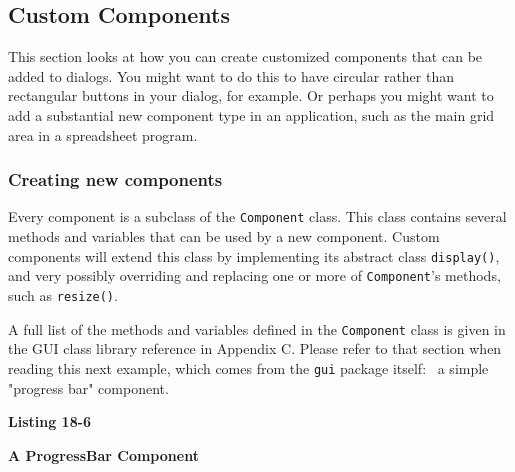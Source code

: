 \subsection{Custom Components}

This section looks at how you can create customized components that can
be added to dialogs. You might want to do this to have circular rather
than rectangular buttons in your dialog, for example. Or perhaps you
might want to add a substantial new component type in an application,
such as the main grid area in a spreadsheet program.

\subsubsection*{Creating new components}

Every component is a subclass of the \texttt{Component}
class. This class contains several methods and variables that can be
used by a new component. Custom components will extend this class by
implementing its abstract class \texttt{display()}, and very possibly
overriding and replacing one or more of
\texttt{Component}'s methods, such as
\texttt{resize()}.

A full list of the methods and variables defined in the
\texttt{Component} class is given in the GUI class library reference in
Appendix C. Please refer to that section when reading this next
example, which comes from the \texttt{gui} package itself: \ a simple
"progress bar" component.

{\sffamily\bfseries
Listing 18-6}

{\sffamily\bfseries
A ProgressBar Component}

